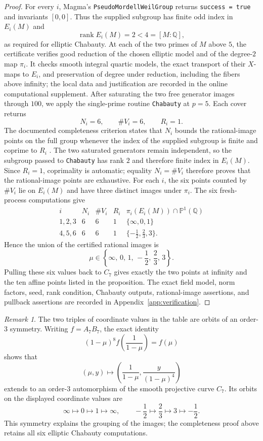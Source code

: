\documentclass[11pt,a4paper]{amsart}
\theoremstyle{definition}
\theoremstyle{remark}
\newtheorem{remark}[theorem]{Remark}
\numberwithin{equation}{section}
\newcommand{\Q}{\mathbb{Q}}
\begin{document}
\begin{proof}
For every $i$, Magma's \texttt{PseudoMordellWeilGroup} returns
\texttt{success = true} and invariants $[0,0]$. Thus the supplied subgroup
has finite odd index in $E_i(M)$ \cite[Example~H133E24]{magmaHandbookChabauty} and
\[
\operatorname{rank}E_i(M)=2<4=[M:\Q],
\]
as required for elliptic Chabauty. At each of the two primes of \(M\)
above \(5\), the certificate verifies good reduction of the chosen
elliptic model and of the degree-\(2\) map \(\pi_i\). It checks smooth
integral quartic models, the exact transport of their \(X\)-maps to
\(E_i\), and preservation of degree under reduction, including the
fibers above infinity; the local data and justification are recorded in
the online computational supplement. After saturating the two free generator images through
$100$, we apply the single-prime routine \texttt{Chabauty} at $p=5$.
Each cover returns
\[
N_i=6,\qquad \#V_i=6,\qquad R_i=1.
\]
The documented completeness criterion states that $N_i$ bounds the rational-image points on the full group whenever the index of the supplied subgroup is finite and coprime to $R_i$ \cite{magmaHandbookChabauty}. The two saturated generators remain independent, so the subgroup passed to \texttt{Chabauty} has rank $2$ and therefore finite index in $E_i(M)$. Since $R_i=1$, coprimality is automatic; equality $N_i=\#V_i$ therefore proves that the rational-image points are exhaustive. For each $i$, the six points counted by $\#V_i$ lie on $E_i(M)$ and have three distinct images under $\pi_i$. The six fresh-process computations give
\[
\begin{array}{c|c|c|c|c}
i&N_i&\#V_i&R_i&\pi_i(E_i(M))\cap\mathbb P^1(\Q)\\ \hline
1,2,3&6&6&1&\{\infty,0,1\}\\
4,5,6&6&6&1&\{-\tfrac12,\tfrac23,3\}.
\end{array}
\]
Hence the union of the certified rational images is
\[
\mu\in\left\{\infty,\,0,\,1,\,-\frac12,\,\frac23,\,3\right\}.
\]
Pulling these six values back to $C_7$ gives exactly the two points at infinity and the ten affine points listed in the proposition. The exact field model, norm factors, seed, rank condition, Chabauty outputs, rational-image assertions, and pullback assertions are recorded in Appendix~\ref{app:verification}.
\end{proof}

\begin{remark}\label{rem:C7-order-three}
The two triples of coordinate values in the table are orbits of an
order-$3$ symmetry. Writing $f=A_7B_7$, the exact identity
\[
(1-\mu)^8f\!\left(\frac1{1-\mu}\right)=f(\mu)
\]
shows that
\[
(\mu,y)\longmapsto
\left(\frac1{1-\mu},\frac{y}{(1-\mu)^4}\right)
\]
extends to an order-$3$ automorphism of the smooth projective curve
$C_7$. Its orbits on the displayed coordinate values are
\[
\infty\longmapsto0\longmapsto1\longmapsto\infty,
\qquad
-\frac12\longmapsto\frac23\longmapsto3\longmapsto-\frac12.
\]
This symmetry explains the grouping of the images; the completeness
proof above retains all six elliptic Chabauty computations.
\end{remark}
\end{document}
